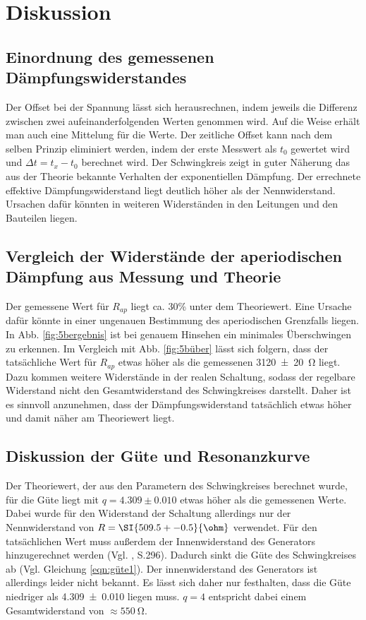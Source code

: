 \section{Diskussion}
\label{sec:Diskussion}
\subsection{Einordnung des gemessenen Dämpfungswiderstandes}
Der Offset bei der Spannung lässt sich herausrechnen, indem jeweils die Differenz
zwischen zwei aufeinanderfolgenden Werten genommen wird. Auf die Weise erhält man
auch eine Mittelung für die Werte. Der zeitliche Offset kann nach dem
selben Prinzip eliminiert werden, indem der erste Messwert als $t_0$ gewertet
wird und $\Delta t = t_x - t_0$ berechnet wird.
Der Schwingkreis zeigt in guter Näherung das aus der Theorie bekannte
Verhalten der exponentiellen Dämpfung. Der errechnete effektive
Dämpfungswiderstand liegt deutlich höher als der Nennwiderstand.
Ursachen dafür könnten in weiteren Widerständen in den Leitungen und den
Bauteilen liegen.

\subsection{Vergleich der Widerstände der aperiodischen Dämpfung
aus Messung und Theorie}
Der gemessene Wert für $R_{ap}$ liegt ca. 30\% unter dem Theoriewert.
Eine Ursache dafür könnte in einer ungenauen Bestimmung des aperiodischen
Grenzfalls liegen. In Abb. \ref{fig:5bergebnis} ist bei genauem Hinsehen ein
minimales Überschwingen zu erkennen. Im Vergleich mit Abb. \ref{fig:5büber}
lässt sich folgern, dass der tatsächliche Wert für $R_{ap}$ etwas höher
als die gemessenen \SI{3120 +- 20}{\ohm} liegt.
Dazu kommen weitere Widerstände in der realen Schaltung, sodass der regelbare
Widerstand nicht den Gesamtwiderstand des Schwingkreises darstellt.
Daher ist es sinnvoll anzunehmen, dass der Dämpfungswiderstand tatsächlich
etwas höher und damit näher am Theoriewert liegt.

\subsection{Diskussion der Güte und Resonanzkurve}
Der Theoriewert, der aus den Parametern des Schwingkreises
berechnet wurde, für die Güte liegt mit $q = 4.309 \pm 0.010$ etwas höher
als die gemessenen Werte. Dabei wurde für den Widerstand der Schaltung allerdings
nur der Nennwiderstand von $R=\SI{509.5+-0.5}{\ohm}$ verwendet. Für den
tatsächlichen Wert muss außerdem der Innenwiderstand des Generators
hinzugerechnet werden (Vgl. \cite{officialmanual}, S.296). Dadurch
sinkt die Güte des Schwingkreises ab (Vgl. Gleichung \ref{eqn:güte1}).
Der innenwiderstand des Generators ist allerdings leider nicht bekannt. Es lässt
sich daher nur festhalten, dass die Güte niedriger als \num{4.309 \pm 0.010}
liegen muss. $q=4$ entspricht dabei
einem Gesamtwiderstand von $\approx \SI{550}{\ohm}$.

